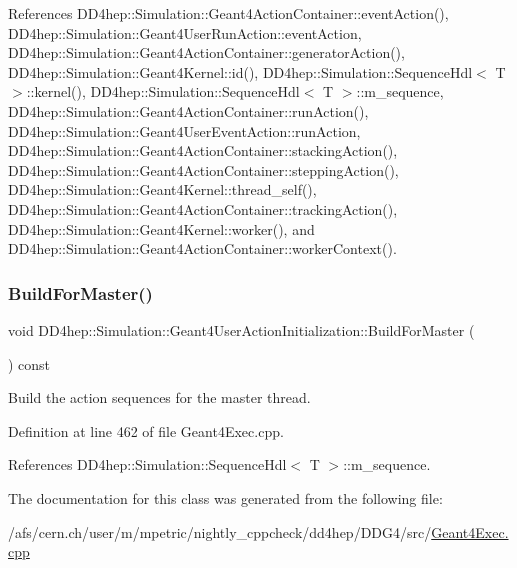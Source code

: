 References D\+D4hep\+::\+Simulation\+::\+Geant4\+Action\+Container\+::event\+Action(), D\+D4hep\+::\+Simulation\+::\+Geant4\+User\+Run\+Action\+::event\+Action, D\+D4hep\+::\+Simulation\+::\+Geant4\+Action\+Container\+::generator\+Action(), D\+D4hep\+::\+Simulation\+::\+Geant4\+Kernel\+::id(), D\+D4hep\+::\+Simulation\+::\+Sequence\+Hdl$<$ T $>$\+::kernel(), D\+D4hep\+::\+Simulation\+::\+Sequence\+Hdl$<$ T $>$\+::m\+\_\+sequence, D\+D4hep\+::\+Simulation\+::\+Geant4\+Action\+Container\+::run\+Action(), D\+D4hep\+::\+Simulation\+::\+Geant4\+User\+Event\+Action\+::run\+Action, D\+D4hep\+::\+Simulation\+::\+Geant4\+Action\+Container\+::stacking\+Action(), D\+D4hep\+::\+Simulation\+::\+Geant4\+Action\+Container\+::stepping\+Action(), D\+D4hep\+::\+Simulation\+::\+Geant4\+Kernel\+::thread\+\_\+self(), D\+D4hep\+::\+Simulation\+::\+Geant4\+Action\+Container\+::tracking\+Action(), D\+D4hep\+::\+Simulation\+::\+Geant4\+Kernel\+::worker(), and D\+D4hep\+::\+Simulation\+::\+Geant4\+Action\+Container\+::worker\+Context().

\hypertarget{class_d_d4hep_1_1_simulation_1_1_geant4_user_action_initialization_a3753e3e5ae78b1a9de8940d4f8057e4a}{}\label{class_d_d4hep_1_1_simulation_1_1_geant4_user_action_initialization_a3753e3e5ae78b1a9de8940d4f8057e4a} 
\subsubsection{\texorpdfstring{Build\+For\+Master()}{BuildForMaster()}}
{\footnotesize\ttfamily void D\+D4hep\+::\+Simulation\+::\+Geant4\+User\+Action\+Initialization\+::\+Build\+For\+Master (\begin{DoxyParamCaption}{ }\end{DoxyParamCaption}) const\hspace{0.3cm}{\ttfamily [virtual]}}



Build the action sequences for the master thread. 



Definition at line 462 of file Geant4\+Exec.\+cpp.



References D\+D4hep\+::\+Simulation\+::\+Sequence\+Hdl$<$ T $>$\+::m\+\_\+sequence.



The documentation for this class was generated from the following file\+:\begin{DoxyCompactItemize}
\item 
/afs/cern.\+ch/user/m/mpetric/nightly\+\_\+cppcheck/dd4hep/\+D\+D\+G4/src/\hyperlink{_geant4_exec_8cpp}{Geant4\+Exec.\+cpp}\end{DoxyCompactItemize}
